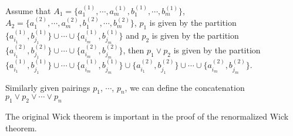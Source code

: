 \begin{defn}
\begin{enumerate}
  Assume that $A_1=\{a^{(1)}_1,\cdots,a^{(1)}_{m}, b^{(1)}_1, \cdots,b^{(1)}_m\}$, $A_2=\{a^{(2)}_1,\cdots,a^{(2)}_{m}, b^{(2)}_1, \cdots,b^{(2)}_m\}$, $p_1$ is given by the partition $\{a^{(1)}_{i_1},b^{(1)}_{j_1}\}\cup\cdots\cup \{a^{(1)}_{i_{m}},b^{(1)}_{j_m}\}$ and $p_2$ is given by the partition $\{a^{(2)}_{i_1},b^{(2)}_{j_1}\}\cup\cdots\cup \{a^{(2)}_{i_{m}},b^{(2)}_{j_m}\}$, then $p_1\vee p_2$ is given by the partition $\{a^{(1)}_{i_1},b^{(1)}_{j_1}\}\cup\cdots\cup \{a^{(1)}_{i_{m}},b^{(1)}_{j_m}\}\cup \{a^{(2)}_{i_1},b^{(2)}_{j_1}\}\cup\cdots\cup \{a^{(2)}_{i_{m}},b^{(2)}_{j_m}\}$.
 
  Similarly given pairings $p_1$, $\cdots$, $p_n$, we can define the concatenation $p_1\vee p_2\vee\cdots\vee p_n$
 \end{enumerate}
 
 
 
 
 \end{defn}
 
 The original Wick theorem is important in the proof of the renormalized Wick theorem.
 
